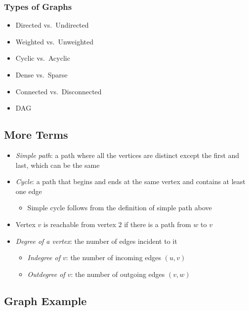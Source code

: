 \documentclass[
  10pt,
  english,
  letterpaper,
,tablecaptionabove
]{scrartcl}
\providecommand{\tightlist}{%
  \setlength{\itemsep}{0pt}\setlength{\parskip}{0pt}}
\begin{document}
\hypertarget{types-of-graphs-1}{%
\subsubsection{Types of Graphs}\label{types-of-graphs-1}}

\begin{itemize}
\tightlist
\item
  Directed vs.~Undirected
\item
  Weighted vs.~Unweighted
\item
  Cyclic vs.~Acyclic
\item
  Dense vs.~Sparse
\item
  Connected vs.~Disconnected
\item
  DAG
\end{itemize}

\hypertarget{more-terms}{%
\subsection{More Terms}\label{more-terms}}

\begin{itemize}
\tightlist
\item
  \emph{Simple path}: a path where all the vertices are distinct except
  the first and last, which can be the same
\item
  \emph{Cycle}: a path that begins and ends at the same vertex and
  contains at least one edge

  \begin{itemize}
  \tightlist
  \item
    Simple cycle follows from the definition of simple path above
  \end{itemize}
\item
  Vertex \(v\) is reachable from vertex \(2\) if there is a path from
  \(w\) to \(v\)
\item
  \emph{Degree of a vertex}: the number of edges incident to it

  \begin{itemize}
  \tightlist
  \item
    \emph{Indegree of \(v\)}: the number of incoming edges \((u,v)\)
  \item
    \emph{Outdegree of \(v\)}: the number of outgoing edges \((v,w)\)
  \end{itemize}
\end{itemize}

\hypertarget{graph-example-1}{%
\subsection{Graph Example}\label{graph-example-1}}
\end{document}
